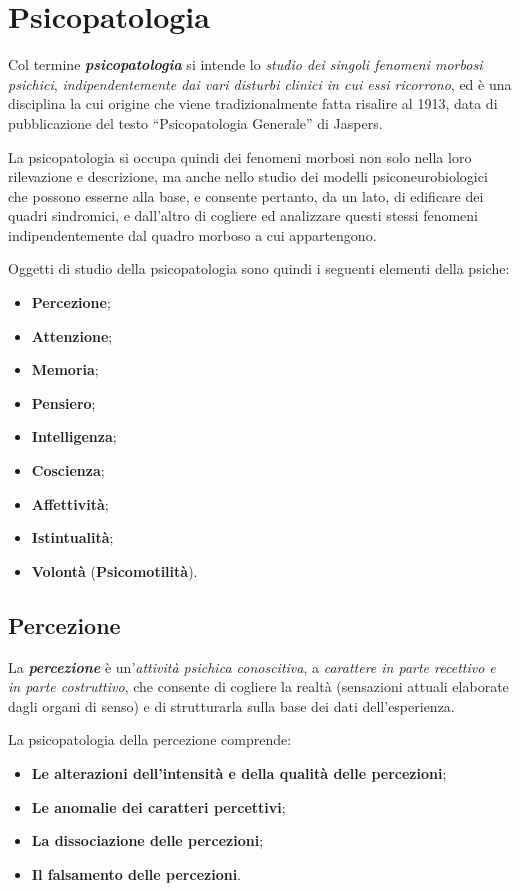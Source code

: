 \section{Psicopatologia}

Col termine \textbf{\emph{psicopatologia}} si intende lo \emph{studio dei singoli fenomeni morbosi psichici}, \emph{indipendentemente dai vari disturbi clinici in cui essi ricorrono}, ed è una disciplina la cui origine che viene tradizionalmente fatta risalire al 1913, data di
pubblicazione del testo ``Psicopatologia Generale'' di Jaspers.

La psicopatologia si occupa quindi dei fenomeni morbosi non solo nella loro rilevazione e descrizione, ma anche nello studio dei modelli psiconeurobiologici che possono esserne alla base, e consente pertanto,
da un lato, di edificare dei quadri sindromici, e dall'altro di cogliere
ed analizzare questi stessi fenomeni indipendentemente dal quadro
morboso a cui appartengono.

Oggetti di studio della psicopatologia sono quindi i seguenti elementi della psiche:

\begin{itemize}
\item
  \textbf{Percezione};
\item
  \textbf{Attenzione};
\item
  \textbf{Memoria};
\item
  \textbf{Pensiero};
\item
  \textbf{Intelligenza};
\item
  \textbf{Coscienza};
\item
  \textbf{Affettività};
\item
  \textbf{Istintualità};
\item
  \textbf{Volontà} (\textbf{Psicomotilità}).
\end{itemize}

\subsection{Percezione}

La \textbf{\emph{percezione}} è un'\emph{attività psichica conoscitiva},
a \emph{carattere in parte recettivo e in parte costruttivo}, che
consente di cogliere la realtà (sensazioni attuali elaborate dagli
organi di senso) e di strutturarla sulla base dei dati dell'esperienza.

La psicopatologia della percezione comprende:

\begin{itemize}
\item
  \textbf{Le alterazioni dell'intensità e della qualità delle
  percezioni};
\item
  \textbf{Le anomalie dei caratteri percettivi};
\item
  \textbf{La dissociazione delle percezioni};
\item
  \textbf{Il falsamento delle percezioni}.
\end{itemize}

